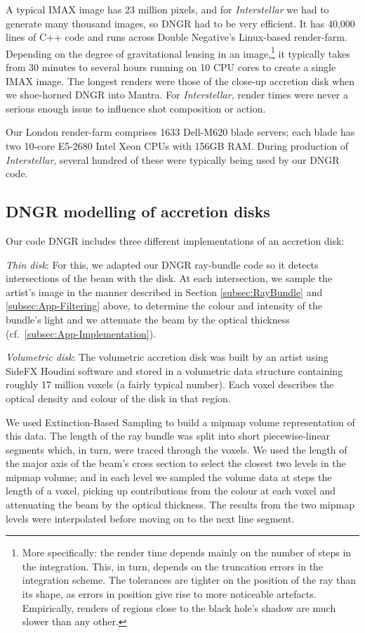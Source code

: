 \documentclass[12pt]{iopart}
\begin{document}
A typical IMAX image has 23 million pixels, and for {\it Interstellar} we had to generate many thousand images, so DNGR had to be very efficient.  It has 40,000 lines of C++ code and runs across Double Negative's Linux-based render-farm. Depending on the degree of gravitational lensing in an image,\footnote{More specifically: the render time depends mainly on the number of steps in the integration.  This, in turn, depends on the truncation errors in the integration scheme.  The tolerances are tighter on the position of the ray than its shape, as errors in position give rise to more noticeable artefacts.  Empirically, renders 
of regions close to the black hole's shadow
are much slower than any other.}
it typically takes from 30 minutes to 
several hours running on 10 CPU cores to create a single IMAX image.  The longest renders were those of the close-up accretion disk when we shoe-horned DNGR into Mantra.  For \emph{Interstellar}, render times were never a serious enough issue to influence shot composition or action.

Our London render-farm comprises 1633 Dell-M620 blade servers; each blade has two 10-core E5-2680 Intel Xeon CPUs with 156GB RAM.
During production of {\it Interstellar}, several hundred of these were typically being used by our DNGR code.

\subsection{DNGR modelling of accretion disks}
\label{subsec:DNGRdisks}

Our code DNGR includes three different implementations of an accretion disk:

\emph{Thin disk}:
For this, we adapted our DNGR ray-bundle code so it detects intersections of the beam with  the disk.  At each intersection,  we sample
the artist's image 
in the manner described in Section \ref{subsec:RayBundle} and
\ref{subsec:App-Filtering} above,
to determine the colour and intensity of the bundle's light and we attenuate the beam  by the optical thickness (cf.\ \ref{subsec:App-Implementation}).  

\emph{Volumetric disk}:
The volumetric accretion disk was built by an artist using SideFX Houdini software and stored in a volumetric data structure containing roughly 17 million voxels (a
fairly typical number). Each voxel describes the optical density and colour of the disk in that region. 

We used Extinction-Based Sampling \cite{KRAUS}
to build a mipmap volume representation of this data.
The length of the ray bundle was split into short piecewise-linear segments which, in turn, were traced through the voxels.
We used the length of the major axis of the beam's cross section to select the closest two levels in the mipmap volume; and in
each level we  sampled the volume data at steps the length of a voxel, picking up contributions from the colour at each voxel
and attenuating the beam by the optical thickness.  
The results from the two mipmap levels were interpolated before
moving on to the next line segment.
\end{document}
